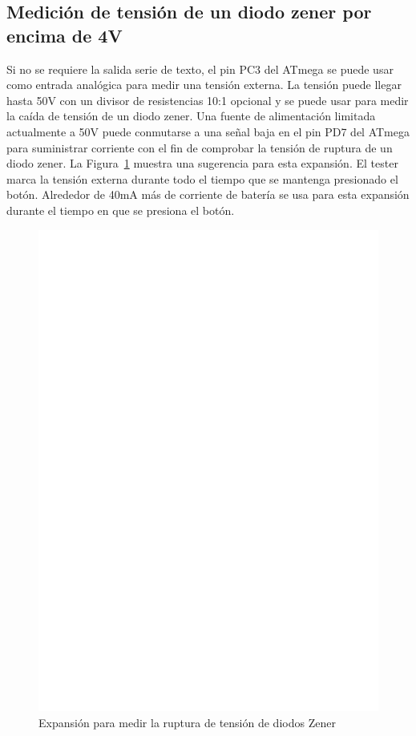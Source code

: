\subsection{Medición de tensión de un diodo zener por encima de 4V}

Si no se requiere la salida  serie de texto, el pin PC3 del ATmega se puede usar  como entrada analógica para medir una
tensión externa. La tensión puede  llegar hasta 50V con un divisor de resistencias 10:1 opcional  y se puede usar para
medir la caída de tensión de un diodo zener. Una fuente de alimentación limitada actualmente a 50V puede conmutarse a
una señal baja en el pin PD7 del ATmega para suministrar corriente con el fin de comprobar la tensión de ruptura de un
diodo zener. La Figura~\ref{fig:zener} muestra una sugerencia para  esta expansión. El tester marca la tensión externa
durante todo el tiempo que se mantenga presionado el botón. Alrededor de 40mA más de corriente de batería se usa para
esta expansión durante el tiempo en que se presiona el botón.

\begin{figure}[H]
\centering
\includegraphics[width=12cm]{../FIG/zener_exp.eps}
\caption{Expansión para medir la ruptura de tensión de diodos Zener}
\label{fig:zener}
\end{figure}

